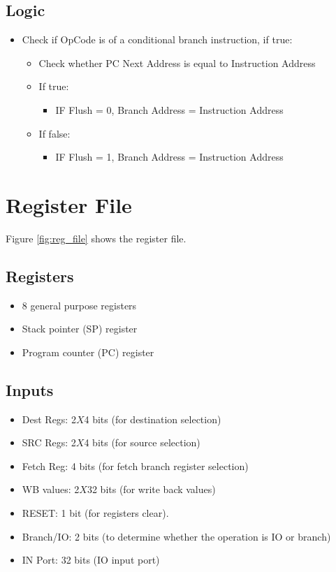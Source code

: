 \subsection{Logic}
\begin{itemize}
    \item Check if OpCode is of a conditional branch instruction, if true:
    \begin{itemize}
        \item Check whether PC Next Address is equal to Instruction Address
        \item If true:
        \begin{itemize}
            \item IF Flush = 0, Branch Address = Instruction Address
        \end{itemize}
        \item If false:
        \begin{itemize}
            \item IF Flush = 1, Branch Address = Instruction Address
        \end{itemize}
    \end{itemize}
\end{itemize}

\section{Register File}
Figure \ref{fig:reg_file} shows the register file.

\subsection{Registers}
\begin{itemize}
    \item 8 general purpose registers
    \item Stack pointer (SP) register
    \item Program counter (PC) register
\end{itemize}

\subsection{Inputs}
\begin{itemize}
    \item Dest Regs: 2$X$4 bits (for destination selection)
    \item SRC Regs: 2$X$4 bits (for source selection)
    \item Fetch Reg: 4 bits (for fetch branch register selection)
    \item WB values: 2$X$32 bits (for write back values)
    \item RESET: 1 bit (for registers clear).
    \item Branch/IO: 2 bits (to determine whether the operation is IO or branch)
    \item IN Port: 32 bits (IO input port)
\end{itemize}

